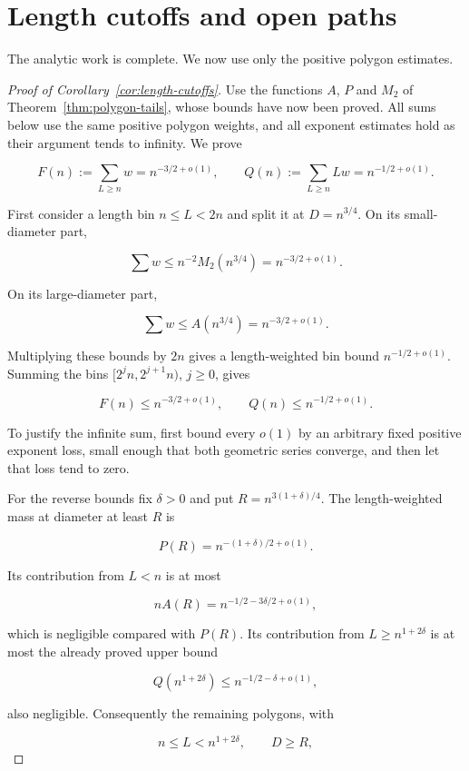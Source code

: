 \section{Length cutoffs and open paths}\label{sec:cutoff-laws}

The analytic work is complete. We now use only the positive polygon estimates.

\begin{proof}[Proof of Corollary~\ref{cor:length-cutoffs}]
Use the functions $A$, $P$ and $M_2$ of Theorem~\ref{thm:polygon-tails}, whose bounds have now been proved. All sums below use the same positive polygon weights, and all exponent estimates hold as their argument tends to infinity. We prove

\[
F(n):=\sum_{L\ge n}w=n^{-3/2+o(1)},\qquad
 Q(n):=\sum_{L\ge n}Lw=n^{-1/2+o(1)}.
\]

First consider a length bin $n\le L<2n$ and split it at $D=n^{3/4}$. On its small-diameter part,

\[
\sum w\le n^{-2}M_2(n^{3/4})=n^{-3/2+o(1)}.
\]

On its large-diameter part,

\[
\sum w\le A(n^{3/4})=n^{-3/2+o(1)}.
\]

Multiplying these bounds by $2n$ gives a length-weighted bin bound $n^{-1/2+o(1)}$. Summing the bins $[2^j n,2^{j+1}n)$, $j\ge0$, gives

\[
F(n)\le n^{-3/2+o(1)},\qquad Q(n)\le n^{-1/2+o(1)}.
\]

To justify the infinite sum, first bound every $o(1)$ by an arbitrary fixed positive exponent loss, small enough that both geometric series converge, and then let that loss tend to zero.

For the reverse bounds fix $\delta>0$ and put $R=n^{3(1+\delta)/4}$. The length-weighted mass at diameter at least $R$ is

\[
P(R)=n^{-(1+\delta)/2+o(1)}.
\]

Its contribution from $L<n$ is at most

\[
nA(R)=n^{-1/2-3\delta/2+o(1)},
\]

which is negligible compared with $P(R)$. Its contribution from $L\ge n^{1+2\delta}$ is at most the already proved upper bound

\[
Q(n^{1+2\delta})\le n^{-1/2-\delta+o(1)},
\]

also negligible. Consequently the remaining polygons, with

\[
n\le L<n^{1+2\delta},\qquad D\ge R,
\]


\end{proof}
